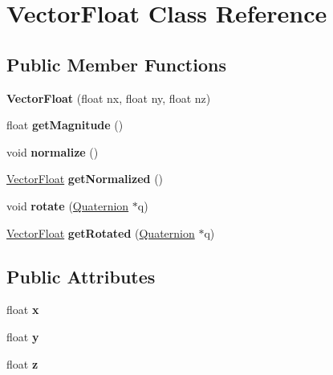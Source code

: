 \hypertarget{classVectorFloat}{}\section{Vector\+Float Class Reference}
\label{classVectorFloat}
\subsection*{Public Member Functions}
\begin{DoxyCompactItemize}
\item 
\mbox{\label{classVectorFloat_a3b12ed03e28bded4316275882433e5aa}} 
{\bfseries Vector\+Float} (float nx, float ny, float nz)
\item 
\mbox{\label{classVectorFloat_abe0c3954d8da8829a053125df1ce63d5}} 
float {\bfseries get\+Magnitude} ()
\item 
\mbox{\label{classVectorFloat_a112eaf8758a6f51b96ed1ccb71700495}} 
void {\bfseries normalize} ()
\item 
\mbox{\label{classVectorFloat_aacb5e7ca59563c47dd066d8b1264ec4b}} 
\mbox{\hyperlink{classVectorFloat}{Vector\+Float}} {\bfseries get\+Normalized} ()
\item 
\mbox{\label{classVectorFloat_afef0e6d631fb1eb67b6913e90730aa9e}} 
void {\bfseries rotate} (\mbox{\hyperlink{classQuaternion}{Quaternion}} $\ast$q)
\item 
\mbox{\label{classVectorFloat_ab4093d50e98baf0d98b437a2b3ee7c2e}} 
\mbox{\hyperlink{classVectorFloat}{Vector\+Float}} {\bfseries get\+Rotated} (\mbox{\hyperlink{classQuaternion}{Quaternion}} $\ast$q)
\end{DoxyCompactItemize}
\subsection*{Public Attributes}
\begin{DoxyCompactItemize}
\item 
\mbox{\label{classVectorFloat_a2d8e5159f045ca977769d168af75320c}} 
float {\bfseries x}
\item 
\mbox{\label{classVectorFloat_a4affe2a9de97600b3d8df98586679e14}} 
float {\bfseries y}
\item 
\mbox{\label{classVectorFloat_a54b8e4234e3b48e106d090570755f107}} 
float {\bfseries z}
\end{DoxyCompactItemize}


